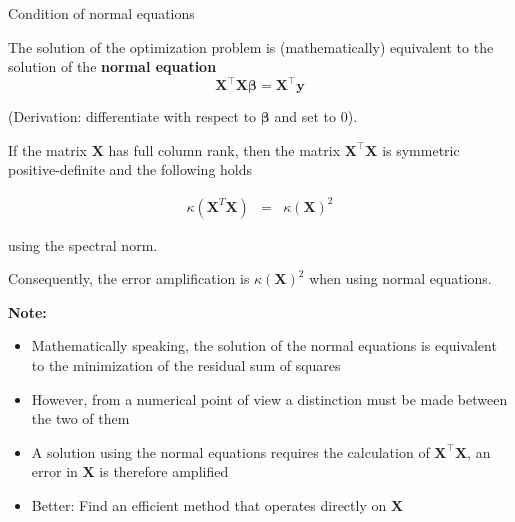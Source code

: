 \documentclass[11pt,compress,t,notes=noshow, xcolor=table]{beamer}
\begin{document}
\begin{vbframe}{Condition of normal equations}

The solution of the optimization problem is (mathematically) equivalent to the solution of the \textbf{normal equation}
$$
\mathbf{X}^\top\mathbf{X}\boldsymbol{\beta} = \mathbf{X}^\top\mathbf{y}
$$

(Derivation: differentiate with respect to $\boldsymbol{\beta}$ and set to $0$).

If the matrix $\mathbf{X}$ has full column rank, then the matrix $\mathbf{X}^\top \mathbf{X}$ is symmetric positive-definite and the following holds

\begin{eqnarray*}
\kappa(\mathbf{X}^T\mathbf{X}) &=& \kappa(\mathbf{X})^2
\end{eqnarray*}

using the spectral norm.

\lz

Consequently, the error amplification is $\kappa(\mathbf{X})^2$ when using normal equations.

\framebreak

\textbf{Note:}
\begin{itemize}
\item Mathematically speaking, the solution of the normal equations is equivalent to the minimization of the residual sum of squares
\item However, from a numerical point of view a distinction must be made between the two of them
\item A solution using the normal equations requires the calculation of $\mathbf{X}^\top \mathbf{X}$, an error in $\mathbf{X}$ is therefore amplified
\item Better: Find an efficient method that operates directly on $\mathbf{X}$
\end{itemize}





\end{vbframe}
\end{document}
